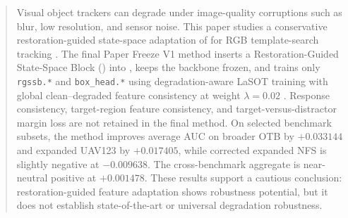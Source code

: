 \begin{abstract}
Visual object trackers can degrade under image-quality corruptions such as blur, low resolution, and sensor noise. This paper studies a conservative restoration-guided state-space adaptation of \baseline{} for RGB template-search tracking . The final Paper Freeze V1 method inserts a Restoration-Guided State-Space Block (\method{}) into \baseline{}, keeps the backbone frozen, and trains only \texttt{rgssb.*} and \texttt{box\_head.*} using degradation-aware LaSOT training with global clean--degraded feature consistency at weight $\lambda=0.02$ . Response consistency, target-region feature consistency, and target-versus-distractor margin loss are not retained in the final method. On selected benchmark subsets, the method improves average AUC on broader OTB by $+0.033144$ and expanded UAV123 by $+0.017405$, while corrected expanded NFS is slightly negative at $-0.009638$. The cross-benchmark aggregate is near-neutral positive at $+0.001478$. These results support a cautious conclusion: restoration-guided feature adaptation shows robustness potential, but it does not establish state-of-the-art or universal degradation robustness.
\end{abstract}
